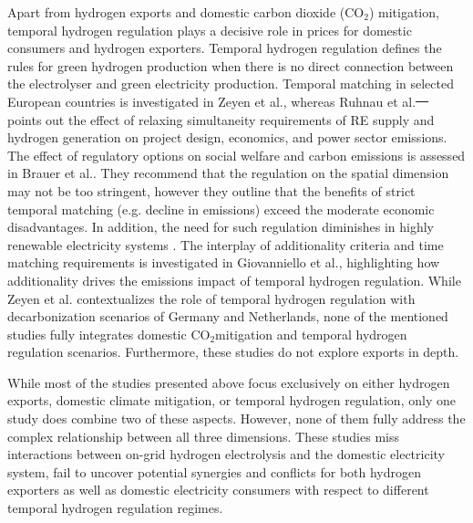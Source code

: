 \documentclass[5p,numafflabel]{elsarticle}
\newcommand{\co}{\ce{CO2}~}
\def\co{CO${}_2${\:}}
\providecommand{\DIFaddtex}[1]{{\protect\color{blue}\uwave{#1}}} %
\providecommand{\DIFdeltex}[1]{{\protect\color{red}\sout{#1}}}                      %
\providecommand{\DIFaddbegin}{} %
\providecommand{\DIFaddend}{} %
\providecommand{\DIFdelbegin}{} %
\providecommand{\DIFdelend}{} %
\providecommand{\DIFadd}[1]{\texorpdfstring{\DIFaddtex{#1}}{#1}} %
\providecommand{\DIFdel}[1]{\texorpdfstring{\DIFdeltex{#1}}{}} %
\newcommand{\DIFscaledelfig}{0.5}
\newlength{\DIFdelgraphicswidth} %
\newlength{\DIFdelgraphicsheight} %
\newcommand{\DIFaddincludegraphics}[2][]{{\color{blue}\fbox{\DIFOincludegraphics[#1]{#2}}}} %
\newcommand{\DIFdelincludegraphics}[2][]{%
\sbox{\DIFdelgraphicsbox}{\DIFOincludegraphics[#1]{#2}}%
\settoboxwidth{\DIFdelgraphicswidth}{\DIFdelgraphicsbox} %
\settoboxtotalheight{\DIFdelgraphicsheight}{\DIFdelgraphicsbox} %
\scalebox{\DIFscaledelfig}{%
\parbox[b]{\DIFdelgraphicswidth}{\usebox{\DIFdelgraphicsbox}\\[-\baselineskip] \rule{\DIFdelgraphicswidth}{0em}}\llap{\resizebox{\DIFdelgraphicswidth}{\DIFdelgraphicsheight}{%
\setlength{\unitlength}{\DIFdelgraphicswidth}%
\begin{picture}(1,1)%
\thicklines\linethickness{2pt} %
{\color[rgb]{1,0,0}\put(0,0){\framebox(1,1){}}}%
{\color[rgb]{1,0,0}\put(0,0){\line( 1,1){1}}}%
{\color[rgb]{1,0,0}\put(0,1){\line(1,-1){1}}}%
\end{picture}%
}\hspace*{3pt}}} %
} %
\DeclareRobustCommand{\DIFaddbegin}{\DIFOaddbegin \let\includegraphics\DIFaddincludegraphics} %
\DeclareRobustCommand{\DIFaddend}{\DIFOaddend \let\includegraphics\DIFOincludegraphics} %
\DeclareRobustCommand{\DIFdelbegin}{\DIFOdelbegin \let\includegraphics\DIFdelincludegraphics} %
\DeclareRobustCommand{\DIFdelend}{\DIFOaddend \let\includegraphics\DIFOincludegraphics} %
\begin{document}
Apart from hydrogen exports and domestic carbon dioxide (CO${}_2$) mitigation, temporal hydrogen regulation plays a decisive role in prices for domestic consumers and hydrogen exporters. 
Temporal hydrogen regulation defines the rules for green hydrogen production when there is no direct connection between the electrolyser and green electricity production.
Temporal matching in selected European countries is investigated in Zeyen et al.\cite{Zeyen2024}, whereas Ruhnau et al.\DIFdelbegin \DIFdel{\mbox{%
\cite{Ruhnau2023a} }\hspace{0pt}%
}\DIFdelend \DIFaddbegin \DIFadd{\mbox{%
\cite{Ruhnau2023} }\hspace{0pt}%
}\DIFaddend points out the effect of relaxing simultaneity requirements of RE supply and hydrogen generation on project design, economics, and power sector emissions.
The effect of regulatory options on social welfare and carbon emissions is assessed in Brauer et al.\cite{Brauer2022}. They recommend that the regulation on the spatial dimension may not be too stringent, however they outline that the benefits of strict temporal matching (e.g. decline in emissions) exceed the moderate economic disadvantages. In addition, the need for such regulation diminishes in highly renewable electricity systems \cite{Brauer2022}.
The interplay of additionality criteria and time matching requirements is investigated in Giovanniello et al.\cite{Giovanniello2024}, highlighting how additionality drives the emissions impact of temporal hydrogen regulation.
While Zeyen et al.\cite{Zeyen2024} contextualizes the role of temporal hydrogen regulation with decarbonization scenarios of Germany and Netherlands, none of the mentioned studies fully integrates domestic \co mitigation and temporal hydrogen regulation scenarios. Furthermore, these studies do not explore exports in depth.

While most of the studies presented above focus exclusively on either hydrogen exports, domestic climate mitigation, or temporal hydrogen regulation, only one study\cite{Muller2024} does combine two of these aspects. However, none of them fully address the complex relationship between all three dimensions. 
These studies miss interactions between on-grid hydrogen electrolysis and the domestic electricity system, fail to uncover potential synergies and conflicts for both hydrogen exporters as well as domestic electricity consumers with respect to different temporal hydrogen regulation regimes.
\end{document}
